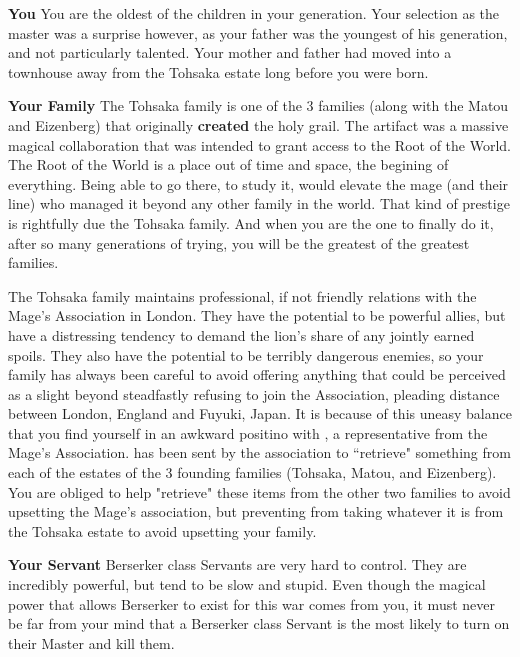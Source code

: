 \documentclass[char]{FDD}
\begin{document}
\name{\cTohsaka{}}

\textbf{You}
You are the oldest of the children in your generation. Your selection as the master was a surprise however, as your father was the youngest of his generation, and not particularly talented. Your mother and father had moved into a townhouse away from the Tohsaka estate long before you were born.

\textbf{Your Family}
The Tohsaka family is one of the 3 families (along with the Matou and Eizenberg) that originally \textbf{created} the holy grail. The artifact was a massive magical collaboration that was intended to grant access to the Root of the World. The Root of the World is a place out of time and space, the begining of everything. Being able to go there, to study it, would elevate the mage (and their line) who managed it beyond any other family in the world. That kind of prestige is rightfully due the Tohsaka family. And when you are the one to finally do it, after so many generations of trying, you will be the greatest of the greatest families.

The Tohsaka family maintains professional, if not friendly relations with the Mage's Association in London. They have the potential to be powerful allies, but have a distressing tendency to demand the lion's share of any jointly earned spoils. They also have the potential to be terribly dangerous enemies, so your family has always been careful to avoid offering anything that could be perceived as a slight beyond steadfastly refusing to join the Association, pleading distance between London, England and Fuyuki, Japan. It is because of this uneasy balance that you find yourself in an awkward positino with \cRi{\full}, a representative from the Mage's Association. \cRi{} has been sent by the association to ``retrieve" something from each of the estates of the 3 founding families (Tohsaka, Matou, and Eizenberg). You are obliged to help \cRi{\then} "retrieve" these items from the other two families to avoid upsetting the Mage's association, but preventing \cRi{\them} from taking whatever it is from the Tohsaka estate to avoid upsetting your family.

\textbf{Your Servant}
Berserker class Servants are very hard to control. They are incredibly powerful, but tend to be slow and stupid. Even though the magical power that allows Berserker to exist for this war comes from you, it must never be far from your mind that a Berserker class Servant is the most likely to turn on their Master and kill them. 
\end{document}
